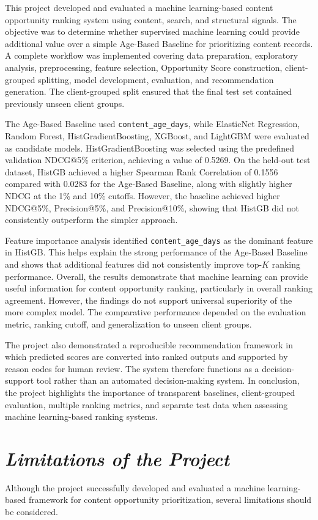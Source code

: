 \documentclass[12pt,a4paper]{report}
\begin{document}
This project developed and evaluated a machine learning-based content opportunity ranking system using content, search, and structural signals. The objective was to determine whether supervised machine learning could provide additional value over a simple Age-Based Baseline for prioritizing content records. A complete workflow was implemented covering data preparation, exploratory analysis, preprocessing, feature selection, Opportunity Score construction, client-grouped splitting, model development, evaluation, and recommendation generation. The client-grouped split ensured that the final test set contained previously unseen client groups.

The Age-Based Baseline used \texttt{content\_age\_days}, while ElasticNet Regression, Random Forest, HistGradientBoosting, XGBoost, and LightGBM were evaluated as candidate models. HistGradientBoosting was selected using the predefined validation NDCG@5\% criterion, achieving a value of 0.5269. On the held-out test dataset, HistGB achieved a higher Spearman Rank Correlation of 0.1556 compared with 0.0283 for the Age-Based Baseline, along with slightly higher NDCG at the 1\% and 10\% cutoffs. However, the baseline achieved higher NDCG@5\%, Precision@5\%, and Precision@10\%, showing that HistGB did not consistently outperform the simpler approach.

Feature importance analysis identified \texttt{content\_age\_days} as the dominant feature in HistGB. This helps explain the strong performance of the Age-Based Baseline and shows that additional features did not consistently improve top-$K$ ranking performance. Overall, the results demonstrate that machine learning can provide useful information for content opportunity ranking, particularly in overall ranking agreement. However, the findings do not support universal superiority of the more complex model. The comparative performance depended on the evaluation metric, ranking cutoff, and generalization to unseen client groups.

The project also demonstrated a reproducible recommendation framework in which predicted scores are converted into ranked outputs and supported by reason codes for human review. The system therefore functions as a decision-support tool rather than an automated decision-making system. In conclusion, the project highlights the importance of transparent baselines, client-grouped evaluation, multiple ranking metrics, and separate test data when assessing machine learning-based ranking systems.

\section{\textit{Limitations of the Project}}
Although the project successfully developed and evaluated a machine learning-based framework for content opportunity prioritization, several limitations should be considered.
\end{document}
